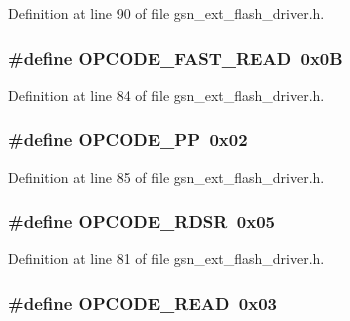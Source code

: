 Definition at line 90 of file gsn\_\-ext\_\-flash\_\-driver.h.

\hypertarget{a00496_a190a2117b2ed1073af355e4d90d5ee23}{
\subsubsection[{OPCODE\_\-FAST\_\-READ}]{\setlength{\rightskip}{0pt plus 5cm}\#define OPCODE\_\-FAST\_\-READ~0x0B}}
\label{a00496_a190a2117b2ed1073af355e4d90d5ee23}


Definition at line 84 of file gsn\_\-ext\_\-flash\_\-driver.h.

\hypertarget{a00496_a3e3acee61fdd12daea9633cbf82ddd86}{
\subsubsection[{OPCODE\_\-PP}]{\setlength{\rightskip}{0pt plus 5cm}\#define OPCODE\_\-PP~0x02}}
\label{a00496_a3e3acee61fdd12daea9633cbf82ddd86}


Definition at line 85 of file gsn\_\-ext\_\-flash\_\-driver.h.

\hypertarget{a00496_aa2e0d9ec33e0196631fd677bdf2c539e}{
\subsubsection[{OPCODE\_\-RDSR}]{\setlength{\rightskip}{0pt plus 5cm}\#define OPCODE\_\-RDSR~0x05}}
\label{a00496_aa2e0d9ec33e0196631fd677bdf2c539e}


Definition at line 81 of file gsn\_\-ext\_\-flash\_\-driver.h.

\hypertarget{a00496_a53a39a0edaa5fc54b0cf28e4965ada63}{
\subsubsection[{OPCODE\_\-READ}]{\setlength{\rightskip}{0pt plus 5cm}\#define OPCODE\_\-READ~0x03}}
\label{a00496_a53a39a0edaa5fc54b0cf28e4965ada63}


